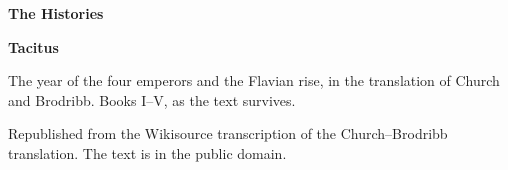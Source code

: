\documentclass[11pt,letterpaper]{article}
\begin{document}
\color{ink}

\begin{titlepage}
\centering
\vspace*{4em}
{\LARGE\bfseries\color{heading} The Histories\par}
\vspace{2em}
{\Large\bfseries\color{heading} Tacitus\par}
\vspace{2.5em}
{\itshape\color{subhead}\parbox{0.8\linewidth}{\centering The year of the four emperors and the Flavian rise, in the translation of Church and Brodribb. Books I--V, as the text survives.\par}}
\vfill
{\small Republished from the Wikisource transcription of the Church--Brodribb translation. The text is in the public domain.\par}
\vspace{2em}
\end{titlepage}

\tableofcontents


\end{document}
